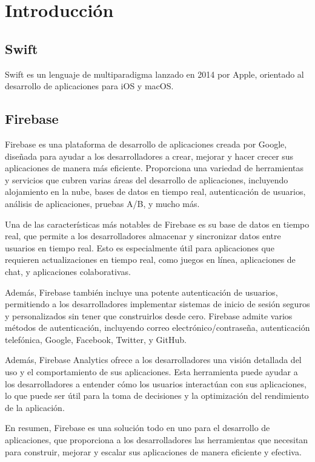 \chapter{Introducción}
    \section{Swift}
    Swift\cite{REF5} es un lenguaje de multiparadigma lanzado en 2014 por Apple, orientado al desarrollo de aplicaciones para iOS y macOS. 
    \section{Firebase}
    Firebase es una plataforma de desarrollo de aplicaciones creada por Google, diseñada para ayudar a los desarrolladores a crear, mejorar y hacer crecer sus aplicaciones de manera más eficiente. Proporciona una variedad de herramientas y servicios que cubren varias áreas del desarrollo de aplicaciones, incluyendo alojamiento en la nube, bases de datos en tiempo real, autenticación de usuarios, análisis de aplicaciones, pruebas A/B, y mucho más.

    Una de las características más notables de Firebase es su base de datos en tiempo real, que permite a los desarrolladores almacenar y sincronizar datos entre usuarios en tiempo real. Esto es especialmente útil para aplicaciones que requieren actualizaciones en tiempo real, como juegos en línea, aplicaciones de chat, y aplicaciones colaborativas.

    Además, Firebase también incluye una potente autenticación de usuarios, permitiendo a los desarrolladores implementar sistemas de inicio de sesión seguros y personalizados sin tener que construirlos desde cero. Firebase admite varios métodos de autenticación, incluyendo correo electrónico/contraseña, autenticación telefónica, Google, Facebook, Twitter, y GitHub.

    Además, Firebase Analytics ofrece a los desarrolladores una visión detallada del uso y el comportamiento de sus aplicaciones. Esta herramienta puede ayudar a los desarrolladores a entender cómo los usuarios interactúan con sus aplicaciones, lo que puede ser útil para la toma de decisiones y la optimización del rendimiento de la aplicación.

    En resumen, Firebase es una solución todo en uno para el desarrollo de aplicaciones, que proporciona a los desarrolladores las herramientas que necesitan para construir, mejorar y escalar sus aplicaciones de manera eficiente y efectiva.
